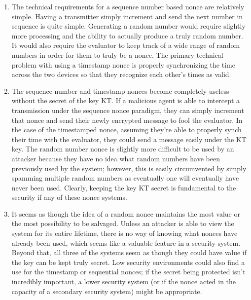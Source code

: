 




\begin{enumerate}
    \item The technical requirements for a sequence number based nonce are relatively simple. Having a transmitter simply increment and send the next number in sequence is quite simple. Generating a random number would require slightly more processing and the ability to actually produce a truly random number. It would also require the evaluator to keep track of a wide range of random numbers in order for them to truly be a nonce. The primary technical problem with using a timestamp nonce is properly synchronizing the time across the two devices so that they recognize each other's times as valid.
    \item The sequence number and timestamp nonces become completely useless without the secret of the key KT. If a malicious agent is able to intercept a transmission under the sequence nonce paradigm, they can simply increment that nonce and send their newly encrypted message to fool the evaluator. In the case of the timestamped nonce, assuming they're able to properly synch their time with the evaluator, they could send a message easily under the KT key. The random number nonce is slightly more difficult to be used by an attacker because they have no idea what random numbers have been previously used by the system; however, this is easily circumvented by simply spamming multiple random numbers as eventually one will eventually have never been used. Clearly, keeping the key KT secret is fundamental to the security if any of these nonce systems.
    \item It seems as though the idea of a random nonce maintains the most value or the most possibility to be salvaged. Unless an attacker is able to view the system for its entire lifetime, there is no way of knowing what nonces have already been used, which seems like a valuable feature in a security system. Beyond that, all three of the systems seem as though they could have value if the key can be kept truly secret. Low security environments could also find a use for the timestamp or sequential nonces; if the secret being protected isn't incredibly important, a lower security system (or if the nonce acted in the capacity of a secondary security system) might be appropriate. \\
\end{enumerate}

